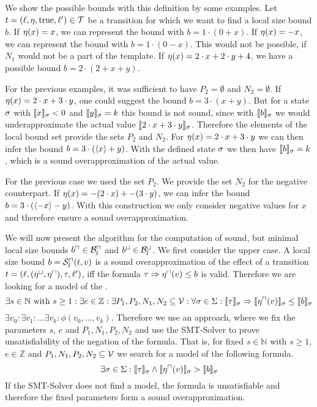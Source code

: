 We show the possible bounds with this definition by some examples.
Let $t = (\ell,\eta,\text{true},\ell') \in \mathcal{T}$ be a transition for which we want to find a local size bound $b$.
If $\eta(x) = x$, we can represent the bound with $b = 1 \cdot (0 + x)$.
If $\eta(x) = -x$, we can represent the bound with $b = 1 \cdot (0 - x)$.
This would not be possible, if $N_1$ would not be a part of the template.
If $\eta(x) = 2 \cdot x + 2 \cdot y + 4$, we have a possible bound $b = 2 \cdot (2 + x + y)$.

For the previous examples, it was sufficient to have $P_2 = \emptyset$ and $N_2 = \emptyset$.
If $\eta(x) = 2 \cdot x + 3 \cdot y$, one could suggest the bound $b = 3 \cdot (x + y)$.
But for a state $\sigma$ with $\llbracket x \rrbracket_{\sigma} < 0$ and $\llbracket y \rrbracket_{\sigma} = k$ this bound is not sound, since with $\llbracket b \rrbracket_{\sigma}$ we would underapproximate the actual value $\llbracket 2 \cdot x + 3 \cdot y \rrbracket_{\sigma}$.
Therefore the elements of the local bound set provide the sets $P_2$ and $N_2$.
For $\eta(x) = 2 \cdot x + 3 \cdot y$ we can then infer the bound $b = 3 \cdot (\langle x\rangle + y)$.
With the defined state $\sigma$ we then have $\llbracket b \rrbracket_{\sigma} = k$, which is a sound overapproximation of the actual value. 

For the previous case we used the set $P_2$.
We provide the set $N_2$ for the negative counterpart.
If $\eta(x) = -(2 \cdot x) + -(3 \cdot y)$, we can infer the bound $b = 3 \cdot (\langle-x\rangle - y)$.
With this construction we only consider negative values for $x$ and therefore ensure a sound overapproximation.

We will now present the algorithm for the computation of sound, but minimal local size bounds $b^\sqcap \in \mathcal{B}^\sqcap_l$ and $b^\sqcup \in \mathcal{B}^\sqcup_l$.
We first consider the upper case.
A local size bound $b = {\mathcal{S}^\sqcap_l}(t,v)$ is a sound overapproximation of the effect of a transition $t = (\ell,(\eta^\sqcup,\eta^\sqcap),\tau,\ell')$, iff the formula $\tau \Rightarrow \eta^\sqcap(v) \leq b$ is valid.
Therefore we are looking for a model of the .
\[ \exists s \in \mathbb{N} \text{ with } s \geq 1:
\exists e \in \mathbb{Z}:
\exists P_1, P_2, N_1, N_2 \subseteq \mathcal{V}:
\forall \sigma \in \Sigma:
\llbracket \tau \rrbracket_{\sigma} \Rightarrow \llbracket \eta^\sqcap(v) \rrbracket_{\sigma} \leq \llbracket b \rrbracket_{\sigma} \]
 $\exists v_0: \exists v_1: \dots \exists v_k: \phi(v_0, \dots, v_k)$.
Therefore we use an approach, where we fix the parameters $s$, $e$ and $P_1, N_1, P_2, N_2$ and use the SMT-Solver to prove unsatisfiability of the negation of the formula.
That is, for fixed $s \in \mathbb{N}$ with $s \geq 1$, $e \in \mathbb{Z}$ and $P_1, N_1, P_2, N_2 \subseteq \mathcal{V}$ we search for a model of the following formula.
\[ \exists \sigma \in \Sigma: \llbracket \tau \rrbracket_{\sigma} \wedge \llbracket \eta^\sqcap(v) \rrbracket_{\sigma} > \llbracket b \rrbracket_{\sigma} \]
If the SMT-Solver does not find a model, the formula is unsatisfiable and therefore the fixed parameters form a sound overapproximation.

